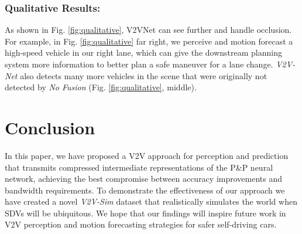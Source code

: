 \documentclass[runningheads]{llncs}
\newcommand{\pnp}{P\&P}
\begin{document}
\subsubsection{Qualitative Results:} As shown in Fig. \ref{fig:qualitative}, V2VNet can see 
further
and handle occlusion. 
For example, in Fig. \ref{fig:qualitative} far right, we perceive and motion forecast a high-speed vehicle in our right lane, which can give the downstream planning system more information to better plan a safe maneuver for a lane change. 
\textit{V2V-Net} also detects many more vehicles in the scene that were originally not detected by \textit{No Fusion} (Fig. \ref{fig:qualitative}, middle).

\section{Conclusion}

In this paper, we have proposed a V2V 
approach for perception and prediction that transmits compressed intermediate representations 
of the \pnp{} neural network,
achieving the best compromise between accuracy improvements and bandwidth requirements. 
To demonstrate the effectiveness of our approach we have created a novel {\it V2V-Sim} 
dataset that realistically simulates the world when SDVs will be ubiquitous.
We hope that our findings will inspire future work in V2V perception and motion forecasting strategies for safer self-driving cars.





\end{document}
